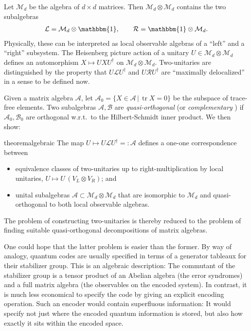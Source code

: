 \documentclass[aps,nofootinbib,floatfix,a4paper]{revtex4}
\newcommand{\1}{\mbox{$\mathbf{1}$}}
\def\A{\mathcal{A}}
\def\B{\mathcal{B}}
\def\M{\mathcal{M}}
\def\Id{\mathbbm{1}}
\DeclareMathOperator{\tr}{tr}
\begin{document}
Let $\M_d$ be the algebra of $d\times d$ matrices.
Then $\M_d\otimes \M_d$ %
contains the two subalgebras
\begin{align*}
	\mathcal{L} = \M_d \otimes \Id, 
	\qquad
	\mathcal{R} = \Id \otimes \M_d.
\end{align*}
Physically, these can be interpreted as local observable algebras of a ``left'' and a ``right'' subsystem.
The Heisenberg picture action of a unitary $U\in \M_{d}\otimes \M_d$ defines an automorphism $X \mapsto U X U^\dagger$ on $\M_d\otimes \M_d$.
Two-unitaries are distinguished by the property that $U\mathcal{L}U^\dagger$ and $U\mathcal{R}U^\dagger$ are  ``maximally delocalized'' in a sense to be defined now.


Given a matrix algebra $\A$, let $\mathcal{A}_0=\{ X \in \A \,|\, \tr X = 0\}$ be the subspace of trace-free elements.
Two subalgebras $\mathcal{A}, \mathcal{B}$ are \emph{quasi-orthogonal} 
\cite{Ohno2007QuasiOrthogonal, ohno2008quasi, weiner2010quasi}
(or \emph{complementary} \cite{Petz2007Complementary, petz2010algebraic})
if $\A_0, \B_0$ are orthogonal w.r.t.\ to the Hilbert-Schmidt inner product.
We then show:

\begin{restatable}{theorem}{algebraic}\label{thm:algebraic}
	The map $U \mapsto U \mathcal{L} U^\dagger =: \A$ defines a one-one correspondence between 
	\begin{itemize}
		\item
			equivalence classes of two-unitaries up to right-multiplication
			by local unitaries,
			$U\mapsto U\,(V_L\otimes V_R)$; and
		\item
			unital subalgebras $\A\subset \M_{d}\otimes \M_d$ that are isomorphic to $\M_d$ and quasi-orthogonal to both local observable algebras.
	\end{itemize}
\end{restatable}

The problem of constructing two-unitaries is thereby reduced to the problem of finding suitable quasi-orthogonal decompositions of matrix algebras.

One could hope that the latter problem is easier than the former.
By way of analogy,
quantum codes are usually specified in terms of a generator tableaux for their stabilizer group.
This is an algebraic description:
The commutant of the stabilizer group is a tensor product of 
an Abelian algebra
(the error syndromes)
and a full matrix algebra
(the observables on the encoded system).
In contrast, it is much less economical to specify the code by giving an explicit encoding operation.
Such an encoder would contain superfluous information:
It would specify not just where the encoded quantum information is stored,
but also how exactly it sits within the encoded space.
\end{document}
